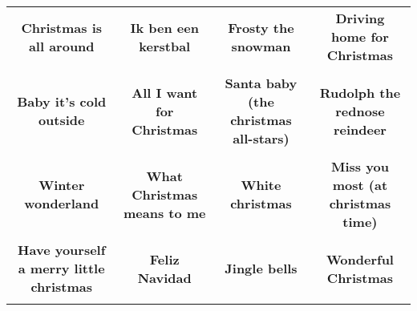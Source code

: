 \documentclass[12pt]{article} \usepackage{eso-pic, graphicx}
\newcommand{\background}[1]{%
\AddToShipoutPictureBG*{\texttt{[image: \#1]}}
}
\begin{document}
\tabcolsep=30.2pt \renewcommand{\arraystretch}{4.5}   \vspace*{4.3cm} \begin{center}  \begin{tabular}{c c c c}
\parbox{3cm}{\centering \textbf{Christmas is all around}}& 
\parbox{3cm}{\centering \textbf{Ik ben een kerstbal}}& 
\parbox{3cm}{\centering \textbf{Frosty the snowman}}& 
\parbox{3cm}{\centering \textbf{Driving home for Christmas}}\\ \\ 
\parbox{3cm}{\centering \textbf{Baby it’s cold outside}}& 
\parbox{3cm}{\centering \textbf{All I want for Christmas}}& 
\parbox{3cm}{\centering \textbf{Santa baby (the christmas all-stars)}}& 
\parbox{3cm}{\centering \textbf{Rudolph the rednose reindeer}}\\ \\ 
\parbox{3cm}{\centering \textbf{Winter wonderland}}& 
\parbox{3cm}{\centering \textbf{What Christmas means to me}}& 
\parbox{3cm}{\centering \textbf{White christmas}}& 
\parbox{3cm}{\centering \textbf{Miss you most (at christmas time)}}\\ \\ 
\parbox{3cm}{\centering \textbf{Have yourself a merry little christmas}}& 
\parbox{3cm}{\centering \textbf{Feliz Navidad}}& 
\parbox{3cm}{\centering \textbf{Jingle bells}}& 
\parbox{3cm}{\centering \textbf{Wonderful Christmas}}\\ \\ 
\end{tabular} \background{discobingo.pdf} \end{center} 
\end{document}
